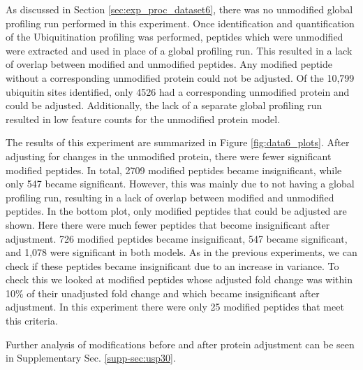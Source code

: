 \documentclass[mcp]{article}
\numberwithin{table}{section}
\begin{document}
As discussed in Section \ref{sec:exp_proc_dataset6}, there was no unmodified global profiling run performed in this experiment. Once identification and quantification of the Ubiquitination profiling was performed, peptides which were unmodified were extracted and used in place of a global profiling run. This resulted in a lack of overlap between modified and unmodified peptides. Any modified peptide without a corresponding unmodified protein could not be adjusted. Of the 10,799 ubiquitin sites identified, only 4526 had a corresponding unmodified protein and could be adjusted. Additionally, the lack of a separate global profiling run resulted in low feature counts for the unmodified protein model.

The results of this experiment are summarized in Figure \ref{fig:data6_plots}. After adjusting for changes in the unmodified protein, there were fewer significant modified peptides. In total, 2709 modified peptides became insignificant, while only 547 became significant. However, this was mainly due to not having a global profiling run, resulting in a lack of overlap between modified and unmodified peptides. In the bottom plot, only modified peptides that could be adjusted are shown. Here there were much fewer peptides that become insignificant after adjustment. 726 modified peptides became insignificant, 547 became significant, and 1,078 were significant in both models. As in the previous experiments, we can check if these peptides became insignificant due to an increase in variance. To check this we looked at modified peptides whose adjusted fold change was within 10\% of their unadjusted fold change and which became insignificant after adjustment. In this experiment there were only 25 modified peptides that meet this criteria.

Further analysis of modifications before and after protein adjustment can be seen in Supplementary Sec. \ref{supp-sec:usp30}.

\end{document}
